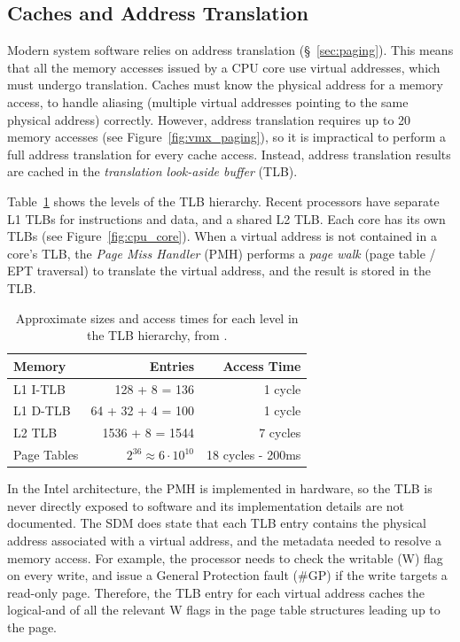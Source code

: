 \subsection{Caches and Address Translation}
\label{sec:tlbs}

Modern system software relies on address translation (\S~\ref{sec:paging}).
This means that all the memory accesses issued by a CPU core use virtual
addresses, which must undergo translation. Caches must know the physical
address for a memory access, to handle aliasing (multiple virtual addresses
pointing to the same physical address) correctly. However, address translation
requires up to 20 memory accesses (see Figure~\ref{fig:vmx_paging}), so it is
impractical to perform a full address translation for every cache access.
Instead, address translation results are cached in the \textit{translation
look-aside buffer} (TLB).

Table~\ref{fig:tlb_timings} shows the levels of the TLB hierarchy. Recent
processors have separate L1 TLBs for instructions and data, and a shared L2
TLB. Each core has its own TLBs (see Figure~\ref{fig:cpu_core}). When a virtual
address is not contained in a core's TLB, the \textit{Page Miss Handler} (PMH)
performs a \textit{page walk} (page table / EPT traversal) to translate the
virtual address, and the result is stored in the TLB.

\begin{table}[hbt]
  \centering
  \begin{tabular}{| l | r | r |}
  \hline
  \textbf{Memory} & \textbf{Entries} & \textbf{Access Time}\\
  \hline
  L1 I-TLB & 128 + 8 = 136 & 1 cycle \\
  \hline
  L1 D-TLB & 64 + 32 + 4 = 100 & 1 cycle \\
  \hline
  L2 TLB & 1536 + 8 = 1544 & 7 cycles \\
  \hline
  Page Tables & $2^{36} \approx 6 \cdot 10^{10} $ & 18 cycles - 200ms \\
  \hline
  \end{tabular}
  \caption{
    Approximate sizes and access times for each level in the TLB hierarchy,
    from \cite{7zip2014haswell}.
  }
  \label{fig:tlb_timings}
\end{table}


In the Intel architecture, the PMH is implemented in hardware, so the TLB is
never directly exposed to software and its implementation details are not
documented.  The SDM does state that each TLB entry contains the physical
address associated with a virtual address, and the metadata needed to resolve a
memory access. For example, the processor needs to check the writable (W) flag
on every write, and issue a General Protection fault (\#GP) if the write
targets a read-only page.  Therefore, the TLB entry for each virtual address
caches the logical-and of all the relevant W flags in the page table structures
leading up to the page.


